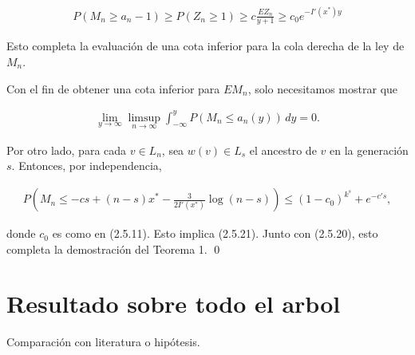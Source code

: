 \documentclass[12pt]{report}
\begin{document}
\begin{align}
P(M_n \geq a_n - 1) \geq P(Z_n \geq 1) \geq c \frac{E Z_n}{y+1} \geq c_0 e^{-I'(x^*) y}
\end{align}

Esto completa la evaluación de una cota inferior para la cola derecha de la ley de $M_n$.

Con el fin de obtener una cota inferior para $EM_n$, solo necesitamos mostrar que

\begin{align}
    \lim_{y \to \infty} \limsup_{n \to \infty} \int_{-\infty}^{y} P(M_n \leq a_n(y)) \, dy = 0. 
\end{align}

Por otro lado, para cada $ v \in L_n $, sea $ w(v) \in L_s $ el ancestro de $v$ en la generación $s$. Entonces, por independencia,

\begin{align}
    P\left(M_n \leq -cs + (n - s)x^* - \frac{3}{2I'(x^*)} \log(n - s) \right) \leq (1 - c_0)^{k^s} + e^{-c's},
\end{align}

donde $ c_0 $ es como en (2.5.11). Esto implica (2.5.21). Junto con (2.5.20), esto completa la demostración del Teorema 1. \qed





\section{Resultado sobre todo el arbol}
Comparación con literatura o hipótesis.
\end{document}
